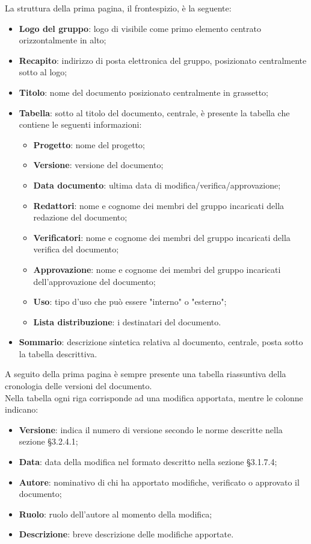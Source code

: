 		La struttura della prima pagina, il frontespizio, è la seguente:
		\begin{itemize}
			\item \textbf{Logo del gruppo}: logo di \Omicron{} visibile come primo elemento centrato orizzontalmente in alto;
			\item \textbf{Recapito}: indirizzo di posta elettronica del gruppo, posizionato centralmente sotto al logo;
			\item \textbf{Titolo}: nome del documento posizionato centralmente in grassetto;
			\item \textbf{Tabella}: sotto al titolo del documento, centrale, è presente la tabella che contiene le seguenti informazioni:
			\begin{itemize}
				\item \textbf{Progetto}: nome del progetto;
				\item \textbf{Versione}: versione del documento;
				\item \textbf{Data documento}: ultima data di modifica/verifica/approvazione;
				\item \textbf{Redattori}: nome e cognome dei membri del gruppo incaricati della redazione del documento;
				\item \textbf{Verificatori}: nome e cognome dei membri del gruppo incaricati della verifica del documento;
				\item \textbf{Approvazione}: nome e cognome dei membri del gruppo incaricati dell'approvazione del documento;
				\item \textbf{Uso}: tipo d'uso che può essere "interno" o "esterno";
				\item \textbf{Lista distribuzione}: i destinatari del documento.
			\end{itemize}
			\item \textbf{Sommario}: descrizione sintetica relativa al documento, centrale, posta sotto la tabella descrittiva.
		\end{itemize}
		
	A seguito della prima pagina è sempre presente una tabella riassuntiva della cronologia delle versioni del documento. \\
	Nella tabella ogni riga corrisponde ad una modifica apportata, mentre le colonne indicano:
	\begin{itemize}
		\item \textbf{Versione}: indica il numero di versione secondo le norme descritte nella sezione §3.2.4.1;
		\item \textbf{Data}: data della modifica nel formato descritto nella sezione §3.1.7.4;
		\item \textbf{Autore}: nominativo di chi ha apportato modifiche, verificato o approvato il documento;
		\item \textbf{Ruolo}: ruolo dell'autore al momento della modifica;
		\item \textbf{Descrizione}: breve descrizione delle modifiche apportate.
	\end{itemize}
	
